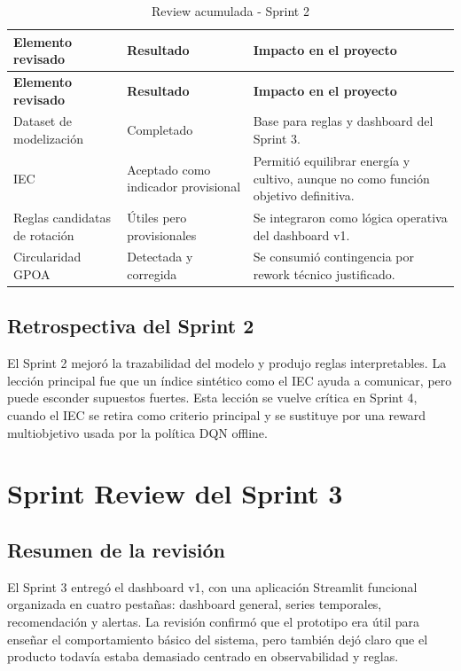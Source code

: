 \documentclass[11pt,a4paper]{article}
\begin{document}
\begin{longtable}{p{}p{}p{}}
\caption{Review acumulada - Sprint 2}\\
\toprule
\textbf{Elemento revisado} & \textbf{Resultado} & \textbf{Impacto en el proyecto} \\
\midrule
\endfirsthead
\toprule
\textbf{Elemento revisado} & \textbf{Resultado} & \textbf{Impacto en el proyecto} \\
\midrule
\endhead
Dataset de modelización & Completado & Base para reglas y dashboard del Sprint 3. \\
IEC & Aceptado como indicador provisional & Permitió equilibrar energía y cultivo, aunque no como función objetivo definitiva. \\
Reglas candidatas de rotación & Útiles pero provisionales & Se integraron como lógica operativa del dashboard v1. \\
Circularidad GPOA & Detectada y corregida & Se consumió contingencia por rework técnico justificado. \\
\bottomrule
\end{longtable}

\subsection{Retrospectiva del Sprint 2}

El Sprint 2 mejoró la trazabilidad del modelo y produjo reglas interpretables. La lección principal fue que un índice sintético como el IEC ayuda a comunicar, pero puede esconder supuestos fuertes. Esta lección se vuelve crítica en Sprint 4, cuando el IEC se retira como criterio principal y se sustituye por una reward multiobjetivo usada por la política DQN offline.

\newpage

\section{Sprint Review del Sprint 3}

\subsection{Resumen de la revisión}

El Sprint 3 entregó el dashboard v1, con una aplicación Streamlit funcional organizada en cuatro pestañas: dashboard general, series temporales, recomendación y alertas. La revisión confirmó que el prototipo era útil para enseñar el comportamiento básico del sistema, pero también dejó claro que el producto todavía estaba demasiado centrado en observabilidad y reglas.
\end{document}
